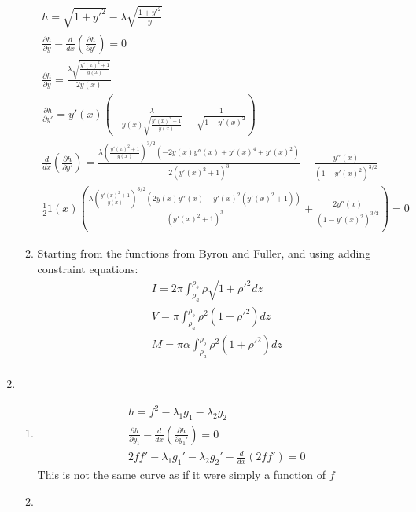 \documentclass[12pt]{article}
\begin{document}
\begin{enumerate}
\begin{enumerate}
      \begin{gather*}
        h=\sqrt{1+y'^2}-\lambda\sqrt{\frac{1+y'^2}{y}}\\
        \frac{\partial h}{\partial y}-\frac{d}{dx}\left(\frac{\partial h}{\partial y'}\right)=0\\
        \frac{\partial h}{\partial y}=\frac{\lambda  \sqrt{\frac{y'(x)^2+1}{y(x)}}}{2 y(x)}\\
        \frac{\partial h}{\partial y'}=y'(x) \left(-\frac{\lambda }{y(x) \sqrt{\frac{y'(x)^2+1}{y(x)}}}-\frac{1}{\sqrt{1-y'(x)^2}}\right)\\
        \frac{d}{dx}\left(\frac{\partial h}{\partial y'}\right)=\frac{\lambda  \left(\frac{y'(x)^2+1}{y(x)}\right)^{3/2} \left(-2 y(x) y''(x)+y'(x)^4+y'(x)^2\right)}{2 \left(y'(x)^2+1\right)^3}+\frac{y''(x)}{\left(1-y'(x)^2\right)^{3/2}}\\
        \frac{1}{2} 1(x) \left(\frac{\lambda  \left(\frac{y'(x)^2+1}{y(x)}\right)^{3/2} \left(2 y(x) y''(x)-y'(x)^2 \left(y'(x)^2+1\right)\right)}{\left(y'(x)^2+1\right)^3}+\frac{2 y''(x)}{\left(1-y'(x)^2\right)^{3/2}}\right)=0
      \end{gather*}
      \item
      Starting from the functions from Byron and Fuller, and using adding constraint equations:
      \begin{gather*}
        I=2\pi\int_{\rho_a}^{\rho_b}\rho\sqrt{1+\rho'^2}dz\\
        V=\pi\int_{\rho_a}^{\rho_b}\rho^2\left(1+\rho'^2\right)dz\\
        M=\pi\alpha\int_{\rho_a}^{\rho_b}\rho^2\left(1+\rho'^2\right)dz\\
      \end{gather*}
    \end{enumerate}
    \item
    \begin{enumerate}
      \item
      \begin{gather*}
        h=f^2-\lambda_1 g_1-\lambda_2 g_2\\
        \frac{\partial h}{\partial y_1}-\frac{d}{dx}\left(\frac{\partial h}{\partial y_1'}\right)=0\\
        2ff'-\lambda_1 g_1'-\lambda_2 g_2'-\frac{d}{dx}\left(2ff'\right)=0
      \end{gather*}
      This is not the same curve as if it were simply a function of $f$
      \item
      \begin{gather*}

\end{gather*}
\end{enumerate}
\end{enumerate}
\end{document}
